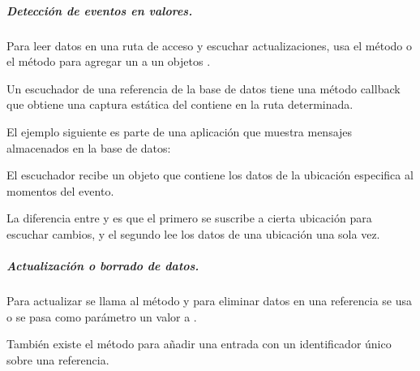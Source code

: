 \subparagraph{Detección de eventos en valores.}
\label{\detokenize{dev_docs:detecteccion-eventos-de-valores}}
Para leer datos en una ruta de acceso y escuchar actualizaciones, usa el
método  o el método 
para agregar un  a un objetos .

Un escuchador  de una referencia de la base de datos
tiene una método callback  que obtiene una captura estática
del contiene en la ruta determinada.

El ejemplo siguiente es parte de una aplicación que muestra mensajes
almacenados en la base de datos:

%
\begin{sphinxVerbatim}[commandchars=\\\{\}]
 
      
       
\end{sphinxVerbatim}

El escuchador recibe un objeto  que contiene los datos de la
ubicación especifica al momentos del evento.

La diferencia entre  y
 es que el primero se suscribe a cierta
ubicación para escuchar cambios, y el segundo lee los datos de una ubicación
una sola vez.


\subparagraph{Actualización o borrado de datos.}
\label{\detokenize{dev_docs:actulizacion-o-borrado-de-datos}}
Para actualizar se llama al método  y para eliminar datos
en una referencia se usa  o se pasa como parámetro un valor
 a .

También existe el método  para añadir una entrada con un identificador
único sobre una referencia.


